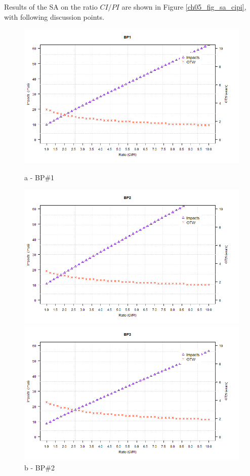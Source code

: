 Results of the SA on the ratio $CI/PI$ are shown in Figure \ref{ch05_fig_sa_cipi}, with following discussion points.


\begin{figure}[!htb]
	\begin{minipage}[b]{0.5\linewidth}
		\centering
		\includegraphics[width=\textwidth]{figures/ch05_fig_sacipi_pump1}
		\caption*{a - BP\#1}
	\end{minipage}
	\hspace{0.05cm}
	\begin{minipage}[b]{0.5\linewidth}
		\centering
		\includegraphics[width=\textwidth]{figures/ch05_fig_sacipi_pump2}
		\caption*{b - BP\#2}
	\end{minipage}
	\hspace{0.05cm}
	\begin{minipage}[b]{0.5\linewidth}
		\centering
		\includegraphics[width=\textwidth]{figures/ch05_fig_sacipi_pump3}

\end{minipage}
\end{figure}
